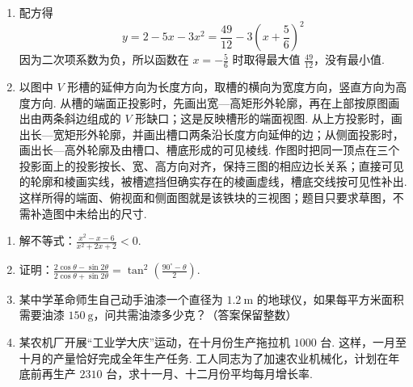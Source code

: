 \begin{solution}
\begin{enumerate}
    \item 配方得
    \[
    y=2-5x-3x^2=\frac{49}{12}-3\left(x+\frac{5}{6}\right)^2
    \]
    因为二次项系数为负，所以函数在 \(x=-\frac{5}{6}\) 时取得最大值 \(\frac{49}{12}\)，没有最小值.

    \item 以图中 \(V\) 形槽的延伸方向为长度方向，取槽的横向为宽度方向，竖直方向为高度方向. 从槽的端面正投影时，先画出宽—高矩形外轮廓，再在上部按原图画出由两条斜边组成的 \(V\) 形缺口；这是反映槽形的端面视图. 从上方投影时，画出长—宽矩形外轮廓，并画出槽口两条沿长度方向延伸的边；从侧面投影时，画出长—高外轮廓及由槽口、槽底形成的可见棱线. 作图时把同一顶点在三个投影面上的投影按长、宽、高方向对齐，保持三图的相应边长关系；直接可见的轮廓和棱画实线，被槽遮挡但确实存在的棱画虚线，槽底交线按可见性补出. 这样所得的端面、俯视面和侧面图就是该铁块的三视图；题目只要求草图，不需补造图中未给出的尺寸.
\end{enumerate}
\end{solution}

\begin{problem}
\begin{enumerate}
    \item 解不等式：\(\frac{x^2-x-6}{x^2+2x+2}<0\).

    \item 证明：\(\frac{2\cos\theta-\sin2\theta}{2\cos\theta+\sin2\theta}=\tan^2\left(\frac{90^\circ-\theta}{2}\right)\).

    \item 某中学革命师生自己动手油漆一个直径为 \(1.2\mathrm{~m}\) 的地球仪，如果每平方米面积需要油漆 \(150\mathrm{~g}\)，问共需油漆多少克？（答案保留整数）

    \item 某农机厂开展“工业学大庆”运动，在十月份生产拖拉机 \(1000\text{ 台}\). 这样，一月至十月的产量恰好完成全年生产任务. 工人同志为了加速农业机械化，计划在年底前再生产 \(2310\text{ 台}\)，求十一月、十二月份平均每月增长率.
\end{enumerate}
\end{problem}

